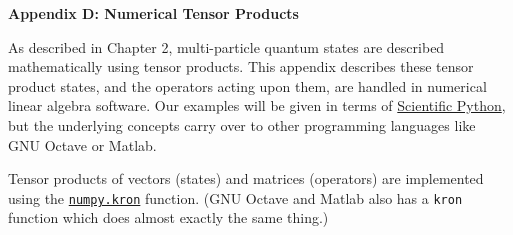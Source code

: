 \documentclass[pra,12pt]{revtex4}
\begin{document}
\begin{center}
{\large \textbf{Appendix D: Numerical Tensor Products}}
\end{center}

As described in Chapter 2, multi-particle quantum states are described
mathematically using tensor products.  This appendix describes these
tensor product states, and the operators acting upon them, are handled
in numerical linear algebra software.  Our examples will be given in
terms of \href{https://scipy.org/}{Scientific Python}, but the
underlying concepts carry over to other programming languages like GNU
Octave or Matlab.

Tensor products of vectors (states) and matrices (operators) are
implemented using the
\href{https://docs.scipy.org/doc/numpy-1.13.0/reference/generated/numpy.kron.html}{\texttt{numpy.kron}}
function.  (GNU Octave and Matlab also has a \texttt{kron} function
which does almost exactly the same thing.)
\end{document}
